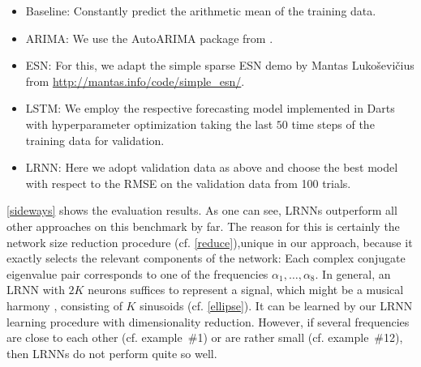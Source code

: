 \documentclass[twoside,11pt]{article}
\theoremstyle{definition}
\begin{document}
\begin{itemize}
  \item Baseline: Constantly predict the arithmetic mean of the training data.
  \item ARIMA: We use the AutoARIMA package from \citet{HK08}.
  \item ESN: For this, we adapt the simple sparse ESN demo by Mantas
	Luko\v{s}evi\v{c}ius from \url{http://mantas.info/code/simple_esn/}.
  \item LSTM: We employ the respective forecasting model implemented in Darts
	with hyperparameter optimization taking the last $50$ time steps of the
	training data for validation.
  \item LRNN: Here we adopt validation data as above and choose the best model
	with respect to the RMSE on the validation data from 100 trials.
\end{itemize}

\cref{sideways} shows the evaluation results. As one can see, LRNNs outperform
all other approaches on this benchmark by far. The reason for this is certainly
the network size reduction procedure (cf. \cref{reduce}),unique in our approach,
because it exactly selects the relevant components of the network: Each complex
conjugate
eigenvalue pair corresponds to one of the frequencies $\alpha_1,\dots,\alpha_8$.
In general, an LRNN with $2K$ neurons suffices to represent a signal, which
might be a musical harmony \citep{Sto17b}, consisting of $K$ sinusoids (cf.
\cref{ellipse}). It can be learned by our LRNN learning procedure with
dimensionality reduction. However, if several frequencies are close to each
other (cf. example~\#1) or are rather small (cf. example~\#12), then LRNNs do
not perform quite so well. 
	
\end{document}
